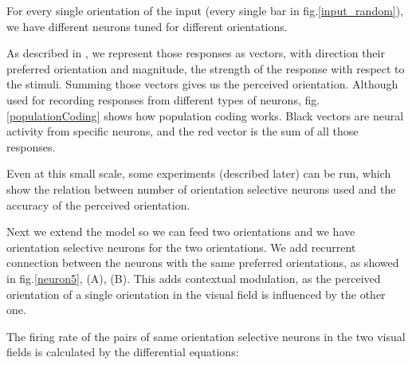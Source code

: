 For every single orientation of the input (every single bar in fig.\ref{input_random}), we have different neurons tuned for different orientations.



As described in \cite{keemink2015unified}, we represent those responses as vectors, with direction their preferred orientation and magnitude, the strength of the response with respect to the stimuli. Summing those vectors gives us the perceived orientation. Although used for recording responses from different types of neurons, fig.\ref{populationCoding} shows how population coding works. Black vectors are neural activity from specific neurons, and the red vector is the sum of all those responses.

Even at this small scale, some experiments (described later) can be run, which show the relation between number of orientation selective neurons used and the accuracy of the perceived orientation.

Next we extend the model so we can feed two orientations and we have orientation selective neurons for the two orientations. We add recurrent connection between the neurons with the same preferred orientations, as showed in fig.\ref{neuron5}, (A), (B). This adds contextual modulation, as the perceived orientation of a single orientation in the visual field is influenced by the other one.

The firing rate of the pairs of same orientation selective neurons in the two visual fields is calculated by the differential equations:

